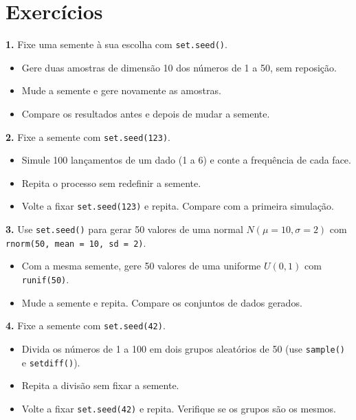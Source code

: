 \documentclass[
  portuguese,
  11pt,
  openany]{book}
\providecommand{\tightlist}{%
  \setlength{\itemsep}{0pt}\setlength{\parskip}{0pt}}
\begin{document}
\section{Exercícios}\label{exercuxedcios-24}

\textbf{1.} Fixe uma semente à sua escolha com \texttt{set.seed()}.

\begin{itemize}
\tightlist
\item
  Gere duas amostras de dimensão 10 dos números de 1 a 50, sem reposição.
\item
  Mude a semente e gere novamente as amostras.
\item
  Compare os resultados antes e depois de mudar a semente.
\end{itemize}

\textbf{2.} Fixe a semente com \texttt{set.seed(123)}.

\begin{itemize}
\tightlist
\item
  Simule 100 lançamentos de um dado (1 a 6) e conte a frequência de cada face.
\item
  Repita o processo sem redefinir a semente.
\item
  Volte a fixar \texttt{set.seed(123)} e repita. Compare com a primeira simulação.
\end{itemize}

\textbf{3.} Use \texttt{set.seed()} para gerar 50 valores de uma normal \(N(\mu = 10, \sigma = 2)\)
com \texttt{rnorm(50,\ mean\ =\ 10,\ sd\ =\ 2)}.

\begin{itemize}
\tightlist
\item
  Com a mesma semente, gere 50 valores de uma uniforme \(U(0, 1)\) com \texttt{runif(50)}.
\item
  Mude a semente e repita. Compare os conjuntos de dados gerados.
\end{itemize}

\textbf{4.} Fixe a semente com \texttt{set.seed(42)}.

\begin{itemize}
\tightlist
\item
  Divida os números de 1 a 100 em dois grupos aleatórios de 50 (use \texttt{sample()} e
  \texttt{setdiff()}).
\item
  Repita a divisão sem fixar a semente.
\item
  Volte a fixar \texttt{set.seed(42)} e repita. Verifique se os grupos são os mesmos.
\end{itemize}
\end{document}
